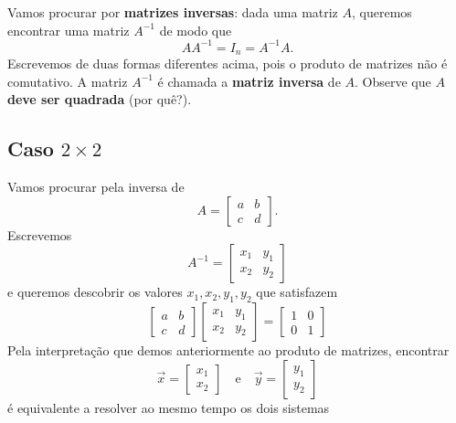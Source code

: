 \documentclass[../livro.tex]{subfiles}  %
\begin{document}
Vamos procurar por \textbf{matrizes inversas}: dada uma matriz $A$, queremos encontrar uma matriz $A^{-1}$ de modo que
\begin{equation}
A A^{-1} = I_n = A^{-1} A.
\end{equation} Escrevemos de duas formas diferentes acima, pois o produto de matrizes não é comutativo. A matriz $A^{-1}$ é chamada a \textbf{matriz inversa} de $A$. Observe que  \textbf{$A$ deve ser quadrada} (por quê?).

\subsection{Caso $2\times 2$}

Vamos procurar pela inversa de
\begin{equation}
A = \left[
\begin{array}{cc}
a & b  \\
c & d 
\end{array}
\right].
\end{equation} Escrevemos
\begin{equation}
A^{-1} = \left[
\begin{array}{cc}
x_1 & y_1  \\
x_2 & y_2 
\end{array}
\right]
\end{equation} e queremos descobrir os valores $x_1, x_2, y_1, y_2$ que satisfazem
\begin{equation}
\left[
\begin{array}{cc}
a & b  \\
c & d 
\end{array}
\right]
\left[
\begin{array}{cc}
x_1 & y_1  \\
x_2 & y_2 
\end{array}
\right] =
\left[
\begin{array}{cc}
1 & 0 \\
0 & 1 
\end{array}
\right]
\end{equation} Pela interpretação que demos anteriormente ao produto de matrizes, encontrar
\begin{equation}
\vec{x} = \left[
\begin{array}{c}
x_1   \\
x_2  
\end{array}
\right] \quad \text{e} \quad
\vec{y} = \left[
\begin{array}{c}
y_1  \\
y_2 
\end{array}
\right]
\end{equation} é equivalente a resolver ao mesmo tempo os dois sistemas
\end{document}
